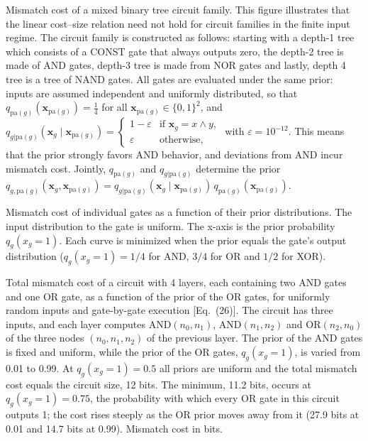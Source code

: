 \caption{Mismatch cost of a mixed binary tree circuit family. This figure illustrates that
the linear cost--size relation need not hold for circuit families in the finite input regime.
The circuit family is constructed as follows: starting with a depth-1 tree which consists of
a CONST gate that always outputs zero, the depth-2 tree is made of AND gates, depth-3 tree is
made from NOR gates and lastly, depth 4 tree is a tree of NAND gates. All gates are evaluated
under the same prior: inputs are assumed independent and uniformly distributed, so that
$q_{\mathrm{pa}(g)}(\boldsymbol{x}_{\mathrm{pa}(g)}) = \tfrac{1}{4}$ for all
$\boldsymbol{x}_{\mathrm{pa}(g)} \in \{0,1\}^2$, and
$q_{g|\mathrm{pa}(g)}(\boldsymbol{x}_g \mid \boldsymbol{x}_{\mathrm{pa}(g)}) =
\begin{cases} 1-\varepsilon & \text{if } \boldsymbol{x}_g = x \land y, \\ \varepsilon & \text{otherwise}, \end{cases}$
with $\varepsilon = 10^{-12}$. This means that the prior strongly favors AND behavior, and
deviations from AND incur mismatch cost. Jointly, $q_{\mathrm{pa}(g)}$ and $q_{g|\mathrm{pa}(g)}$
determine the prior
$q_{g,\mathrm{pa}(g)}(\boldsymbol{x}_g, \boldsymbol{x}_{\mathrm{pa}(g)}) =
q_{g|\mathrm{pa}(g)}(\boldsymbol{x}_g \mid \boldsymbol{x}_{\mathrm{pa}(g)})\,
q_{\mathrm{pa}(g)}(\boldsymbol{x}_{\mathrm{pa}(g)})$.}

\caption{Mismatch cost of individual gates as a function of their prior distributions. The
input distribution to the gate is uniform. The x-axis is the prior probability
$q_g(x_g = 1)$. Each curve is minimized when the prior equals the gate's output distribution
($q_g(x_g = 1) = 1/4$ for AND, $3/4$ for OR and $1/2$ for XOR).}

\caption{Total mismatch cost of a circuit with 4 layers, each containing two AND gates
and one OR gate, as a function of the prior of the OR gates, for uniformly random inputs
and gate-by-gate execution [Eq.~(26)]. The circuit has three inputs, and each layer
computes $\mathrm{AND}(n_0, n_1)$, $\mathrm{AND}(n_1, n_2)$ and $\mathrm{OR}(n_2, n_0)$ of
the three nodes $(n_0, n_1, n_2)$ of the previous layer. The prior of the AND gates is
fixed and uniform, while the prior of the OR gates, $q_g(x_g = 1)$, is varied from 0.01
to 0.99. At $q_g(x_g = 1) = 0.5$ all priors are uniform and the total mismatch cost
equals the circuit size, 12 bits. The minimum, 11.2 bits, occurs at
$q_g(x_g = 1) = 0.75$, the probability with which every OR gate in this circuit outputs 1;
the cost rises steeply as the OR prior moves away from it (27.9 bits at 0.01 and
14.7 bits at 0.99). Mismatch cost in bits.}
